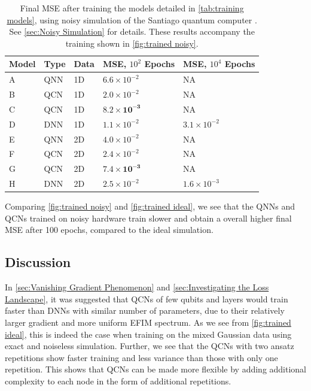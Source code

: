 \begin{table}[H]
\centering
\caption{Final MSE after training the models detailed in \autoref{tab:training models}, using noisy simulation of the Santiago quantum computer \cite{santiago}. See \autoref{sec:Noisy Simulation} for details. These results accompany the training shown in \autoref{fig:trained noisy}.} 
\begin{tabular}{|l|l|l|l|l|}
\hline
Model& Type& Data& MSE, $10^{2}$ Epochs& MSE, $10^{4}$ Epochs \\ \hline
A    & QNN & 1D  & $6.6 \times 10^{-2}$   & NA   \\ \hline
B    & QCN & 1D  & $2.0\times 10^{-2}$  & NA \\ \hline
C    & QCN & 1D  & $\boldsymbol{8.2\times 10^{-3}}$  & NA  \\ \hline
D    & DNN & 1D  & $1.1\times 10^{-2}$ & $3.1\times 10^{-2}$  \\ \Xhline{2\arrayrulewidth}
E    & QNN & 2D  &  $4.0 \times 10^{-2}$                  & NA  \\ \hline
F    & QCN & 2D  &  $2.4\times 10^{-2}$ & NA  \\ \hline
G    & QCN & 2D  &  $\boldsymbol{7.4\times 10^{-3}}$ & NA  \\ \hline
H    & DNN & 2D  &  $2.5\times10^{-2}$ & $1.6\times10^{-3}$\\\hline
\end{tabular}

\label{tab:training models mse noisy}
\end{table}

Comparing \autoref{fig:trained noisy} and \autoref{fig:trained ideal}, we see that the QNNs and QCNs trained on noisy hardware train slower and obtain a overall higher final MSE after 100 epochs, compared to the ideal simulation. 


\subsection{Discussion}\label{sec:Training Discussion}
In \autoref{sec:Vanishing Gradient Phenomenon} and \autoref{sec:Investigating the Loss Landscape}, it was suggested that QCNs of few qubits and layers would train faster than DNNs with similar number of parameters, due to their relatively larger gradient and more uniform EFIM spectrum. As we see from \autoref{fig:trained ideal}, this is indeed the case when training on the mixed Gaussian data using exact and noiseless simulation.
Further, we see that the QCNs with two ansatz repetitions show faster training and less variance than those with only one repetition. This shows that QCNs can be made more flexible by adding additional complexity to each node in the form of additional repetitions. 

